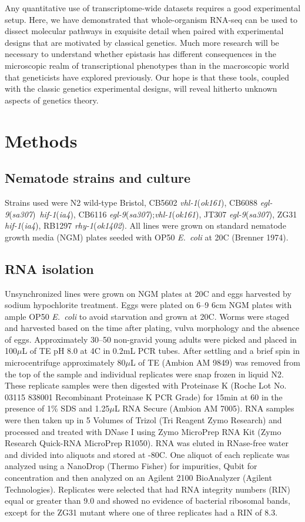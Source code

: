 \documentclass[10pt, onecolumn]{article}
\newcommand{\ecol}{\emph{E.~coli}}
\newcommand{\gene}[1]{\emph{#1}}
\begin{document}
Any quantitative use of transcriptome-wide datasets requires a good experimental
setup. Here, we have demonstrated that whole-organism RNA-seq can be used to
dissect molecular pathways in exquisite detail when paired with experimental
designs that are motivated by classical genetics. Much more research will be
necessary to understand whether epistasis has different consequences in the
microscopic realm of transcriptional phenotypes than in the macroscopic world
that geneticists have explored previously. Our hope is that these tools, coupled
with the classic genetics experimental  designs, will reveal hitherto unknown
aspects of genetics theory.

\section*{Methods}
\label{sec:methods}
\subsection*{Nematode strains and culture}
Strains used were N2 wild-type Bristol,
CB5602 \gene{vhl-1}(\emph{ok161}),
CB6088 \gene{egl-9}(\emph{sa307})~\gene{hif-1}(\emph{ia4}),
CB6116 \gene{egl-9}(\emph{sa307});\gene{vhl-1}(\emph{ok161}),
JT307 \gene{egl-9}(\emph{sa307}),
ZG31 \gene{hif-1}(\emph{ia4}),
RB1297 \gene{rhy-1}(\emph{ok1402}).
All lines were grown on standard
nematode growth media (NGM) plates seeded with OP50 \ecol{} at 20\degree{}C
(Brenner 1974).

\subsection*{RNA isolation}
Unsynchronized lines were grown on NGM plates at 20\degree{}C and eggs harvested
by sodium hypochlorite treatment. Eggs were plated on 6--9 6cm NGM plates with
ample OP50 \ecol{} to avoid starvation and grown at 20\degree{}C. Worms were
staged and harvested based on the time after plating, vulva morphology and the
absence of eggs.  Approximately 30--50 non-gravid young adults were picked and
placed in 100$\mu$L of TE pH 8.0 at 4\degree{}C in $0.2$mL PCR tubes. After
settling and a brief spin in microcentrifuge approximately $80\mu$L of TE (Ambion
AM 9849) was removed from the top of the sample and individual replicates were
snap frozen in liquid N2. These replicate samples were then digested with
Proteinase K (Roche Lot No. 03115 838001 Recombinant Proteinase K PCR Grade) for
15min at 60\degree{} in the presence of 1\% SDS and 1.25$\mu$L RNA Secure
(Ambion AM 7005). RNA samples were then taken up in 5 Volumes of Trizol (Tri
Reagent Zymo Research) and processed and treated with DNase I using Zymo
MicroPrep RNA Kit (Zymo Research Quick-RNA MicroPrep R1050). RNA was eluted in
RNase-free water and divided into aliquots and stored at -80\degree{}C. One
aliquot of each replicate was analyzed using a NanoDrop (Thermo Fisher) for
impurities, Qubit for concentration and then analyzed on an Agilent 2100
BioAnalyzer (Agilent Technologies). Replicates were selected that had RNA
integrity numbers (RIN) equal or greater than 9.0 and showed no evidence of
bacterial ribosomal bands, except for the ZG31 mutant where one of three
replicates had a RIN of 8.3.
\end{document}
